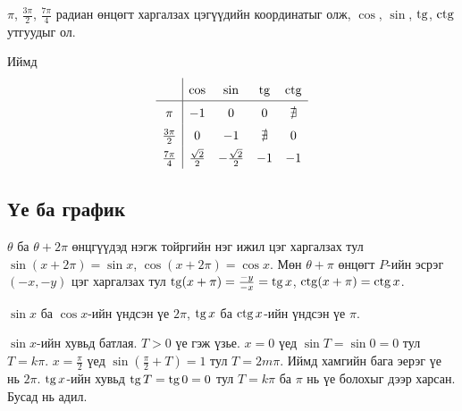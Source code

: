 \begin{example}
$\pi$, $\frac{3\pi}{2}$, $\frac{7\pi}{4}$ радиан өнцөгт харгалзах цэгүүдийн координатыг олж,
$\cos$, $\sin$, $\operatorname{tg}$, $\operatorname{ctg}$ утгуудыг ол.
\begin{center}
\end{center}
Иймд
\[
\renewcommand{\arraystretch}{1.5}
\begin{array}{c|cccc}
 & \cos & \sin & \tg & \ctg \\\hline
\pi & -1 & 0 & 0 & \nexists \\
\frac{3\pi}{2} & 0 & -1 & \nexists & 0 \\
\frac{7\pi}{4} & \frac{\sqrt{2}}{2} & -\frac{\sqrt{2}}{2} & -1 & -1
\end{array}
\]
\end{example}

\subsection{Үе ба график}
$\theta$ ба $\theta+2\pi$ өнцгүүдэд нэгж тойргийн нэг ижил цэг харгалзах тул
$\sin(x+2\pi)=\sin x$, $\cos(x+2\pi)=\cos x$. Мөн $\theta+\pi$ өнцөгт $P$-ийн эсрэг
$(-x,-y)$ цэг харгалзах тул $\operatorname{tg}(x+\pi)=\frac{-y}{-x}=\operatorname{tg} x$, $\operatorname{ctg}(x+\pi)=\operatorname{ctg} x$.

\begin{theorem}[Үндсэн үе]
$\sin x$ ба $\cos x$-ийн үндсэн үе $2\pi$, $\operatorname{tg} x$ ба $\operatorname{ctg} x$-ийн үндсэн үе $\pi$.
\end{theorem}
\begin{prof}
$\sin x$-ийн хувьд батлая. $T>0$ үе гэж үзье. $x=0$ үед $\sin T=\sin0=0$ тул $T=k\pi$.
$x=\frac{\pi}{2}$ үед $\sin\!\left(\frac{\pi}{2}+T\right)=1$ тул $T=2m\pi$. Иймд хамгийн бага
эерэг үе нь $2\pi$. $\operatorname{tg} x$-ийн хувьд $\operatorname{tg} T=\operatorname{tg} 0=0$ тул $T=k\pi$ ба $\pi$ нь үе болохыг
дээр харсан. Бусад нь адил.
\end{prof}

